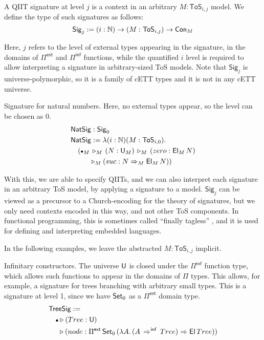 \documentclass[sigplan,review,anonymous]{acmart}\settopmatter{printfolios=true,printccs=false,printacmref=false}
\newcommand{\ToS}{\mathsf{ToS}}
\newcommand{\ext}{\triangleright}
\newcommand{\emptycon}{\scaleobj{.75}\bullet}
\newcommand{\Pii}{\Pi}
\newcommand{\Pie}{\Pi^{\mathsf{ext}}}
\newcommand{\Piinf}{\Pi^{\mathsf{inf}}}
\newcommand{\Sig}{\mathsf{Sig}}
\newcommand{\NatSig}{\mathsf{NatSig}}
\newcommand{\arri}{\Rightarrow}
\newcommand{\arrinf}{\Rightarrow^{\mathsf{inf}}}
\begin{document}
\begin{definition}\label{def:signature}
A QIIT signature at level $j$ is a context in an arbitrary $M : \ToS_{i,j}$
model. We define the type of such signatures as follows:
\[
  \Sig_j := (i : \mathbb{N})\ra(M : \ToS_{i,j})\ra \Con_M
\]

Here, $j$ refers to the level of external types appearing in the signature, in
the domains of $\Pie$ and $\Piinf$ functions, while the quantified $i$ level is
required to allow interpreting a signature in arbitrary-sized ToS models. Note
that $\Sig_j$ is universe-polymorphic, so it is a family of cETT types and it is
not in any cETT universe.

\begin{example}{
    Signature for natural numbers. Here, no external types appear, so the level
    can be chosen as $0$.}
\begin{alignat*}{3}
  & \NatSig : \Sig_0 \\
  & \NatSig := \lambda (i :\mathbb{N})(M : \ToS_{i,0}).\\
  & \hspace{1em}(\emptycon_M\,\ext_M\, (N : \U_M) \,\ext_M\,(zero : \El_M\,N)\\
  & \hspace{2.67em}\ext_M (suc : N\arri_M\El_M\,N))
\end{alignat*}
\end{example}

With this, we are able to specify QIITs, and we can also interpret each
signature in an arbitrary ToS model, by applying a signature to a model.
$\Sig_j$ can be viewed as a precursor to a Church-encoding for the theory of
signatures, but we only need contexts encoded in this way, and not other ToS
components. In functional programming, this is sometimes called ``finally
tagless'' \cite{carette2007finally}, and it is used for defining and interpreting
embedded languages.
\end{definition}

In the following examples, we leave the abstracted $M : \ToS_{i,j}$ implicit.

\begin{example}{Infinitary constructors}. The universe $\mathsf{U}$ is closed under
the $\Piinf$ function type, which allows such functions to appear in the domains
of $\Pii$ types. This allows, for example, a signature for trees branching with
arbitrary small types. This is a signature at level 1, since we have $\mathsf{Set}_0$ as
a $\Pie$ domain type.
\begin{alignat*}{3}
& \mathsf{TreeSig} := \\
& \hspace{1em}\emptycon \ext (Tree : \U)\\
& \hspace{1.35em}\ext (node : \Pie\,\Set_0\,(\lambda A.\,(A\,\arrinf\,Tree)\arri\El\,Tree))
\end{alignat*}
\end{example}
\end{document}
